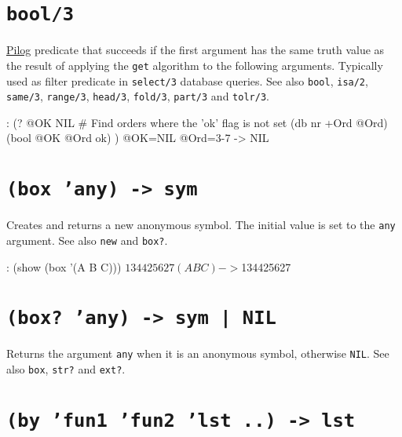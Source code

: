  
\section*{\texttt{bool/3}}
\label{sec:funct-ref-B-bool/3}


\hyperref[ref.html-pilog]{Pilog} predicate that succeeds if the first argument
has the same truth value as the result of applying the \texttt{get} algorithm
to the following arguments. Typically used as filter predicate in
\texttt{select/3} database queries. See also \texttt{bool}, \texttt{isa/2}, \texttt{same/3},
\texttt{range/3}, \texttt{head/3}, \texttt{fold/3}, \texttt{part/3} and \texttt{tolr/3}.


\begin{wideverbatim}
: (? @OK NIL         # Find orders where the 'ok' flag is not set
   (db nr +Ord @Ord)
   (bool @OK @Ord ok) )
 @OK=NIL @Ord={3-7}
-> NIL
\end{wideverbatim}

 
\section*{\texttt{(box 'any) -> sym}}
\label{sec:funct-ref-B-(box-'any)-->-sym}


Creates and returns a new anonymous symbol. The initial value is set to
the \texttt{any} argument. See also \texttt{new} and \texttt{box?}.


\begin{wideverbatim}
: (show (box '(A B C)))
$134425627 (A B C)
-> $134425627
\end{wideverbatim}

 
\section*{\texttt{(box? 'any) -> sym | NIL}}
\label{sec:funct-ref-B-(box?-'any)-->-sym-|-nil}


Returns the argument \texttt{any} when it is an anonymous symbol, otherwise
\texttt{NIL}. See also \texttt{box}, \texttt{str?} and \texttt{ext?}.



 
\section*{\texttt{(by 'fun1 'fun2 'lst ..) -> lst}}
\label{sec:funct-ref-B-(by-'fun1-'fun2-'lst-..)-->-lst}


